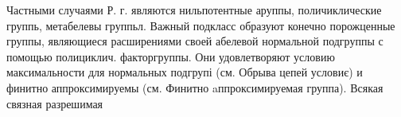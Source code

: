 \documentclass[10pt]{article}
\begin{document}
Частными случаями Р. г. являются нильпотентные аруппы, поличиклические группь, метабелевы группьл. Важный подкласс образуют конечно порожценные группы, являющиеся расширениями своей абелевой нормальной подгруппы с помощью полициклич. факторгруппы. Они удовлетворяют условию максимальности для нормальных подгрупі (см. Обрыва цепей условиє) и финитно аппроксимируемы (см. Финитно aппроксимируемая группа). Всякая связная разрешимая
\end{document}
